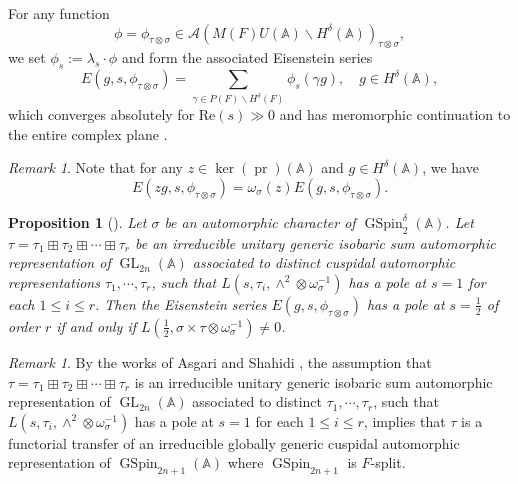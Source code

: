 \documentclass[12pt]{amsart}
\newcommand{\A}{\mathbb{A}}
\newtheorem{proposition}[theorem]{Proposition}%
\theoremstyle{remark}
\newtheorem{remark}[theorem]{Remark}%
\newcommand{\pr}{\operatorname{pr}}
\DeclareMathOperator{\GL}{GL}
\DeclareMathOperator{\GSpin}{GSpin}
\newcommand{\bs}{\backslash}
\begin{document}
For any function 
\begin{equation}
\label{eq-phi-section}
\phi=\phi_{\tau\otimes\sigma}\in \mathcal{A}(M(F)U(\A)\bs H^\delta(\A))_{\tau\otimes \sigma},
\end{equation}
we set $\phi_{s}:=\lambda_s\cdot \phi$ and form the associated Eisenstein series
\begin{equation}
\label{eq-EisenSeries}
E(g, s, \phi_{\tau\otimes\sigma})=\sum_{\gamma\in P(F)\backslash H^\delta(F)} \phi_s(\gamma g), \quad g\in H^\delta(\A),
\end{equation}
which converges absolutely for $\mathrm{Re}(s)\gg 0$ and has meromorphic continuation to the entire complex plane \cite[\S IV]{MoglinWaldspurger1995}.
 
\begin{remark}
\label{remark-Eisenstein-series-central-char}
Note that for any $z\in \ker(\pr)(\A)$ and $g\in H^{\delta}(\A)$, we have 
\begin{equation*}
	E(zg, s, \phi_{\tau\otimes\sigma})=\omega_{\sigma}(z) E(g, s, \phi_{\tau\otimes\sigma}).
\end{equation*}
\end{remark}


\begin{proposition}[\cite{Yan2025GGP}]\label{prop-Eisenstein-pole}
Let $\sigma$ be an automorphic character of $\GSpin^\delta_2(\A)$. Let $\tau=\tau_1\boxplus \tau_2\boxplus \cdots \boxplus \tau_r$ be an irreducible unitary generic isobaric sum automorphic representation of $\GL_{2n}(\A)$ associated to distinct cuspidal automorphic representations $\tau_1, \cdots, \tau_r$, such that $L(s, \tau_i, \wedge^2\otimes\omega_{\sigma}^{-1})$ has a pole at $s=1$ for each $1\le i\le r$.  Then the Eisenstein series $E(g, s, \phi_{\tau\otimes\sigma})$ has a pole at $s=\frac{1}{2}$ of order $r$ if and only if
   $L(\frac{1}{2}, \sigma\times \tau\otimes \omega_\sigma^{-1})\neq 0$.
\end{proposition}

\begin{remark}
\label{remark-tau-in-generic-spectrum}
By the works of Asgari and Shahidi \cite{AsgariShahidi2006, AsgariShahidi2014}, the assumption that 	$\tau=\tau_1\boxplus \tau_2\boxplus \cdots \boxplus \tau_r$ is an irreducible unitary generic isobaric sum automorphic representation of $\GL_{2n}(\A)$ associated to distinct $\tau_1, \cdots, \tau_r$, such that $L(s, \tau_i, \wedge^2\otimes\omega_{\sigma}^{-1})$ has a pole at $s=1$ for each $1\le i\le r$, implies that $\tau$ is a functorial transfer of an irreducible globally generic cuspidal automorphic representation of   $\GSpin_{2n+1}(\A)$ where $\GSpin_{2n+1}$ is $F$-split.
\end{remark}
\end{document}
